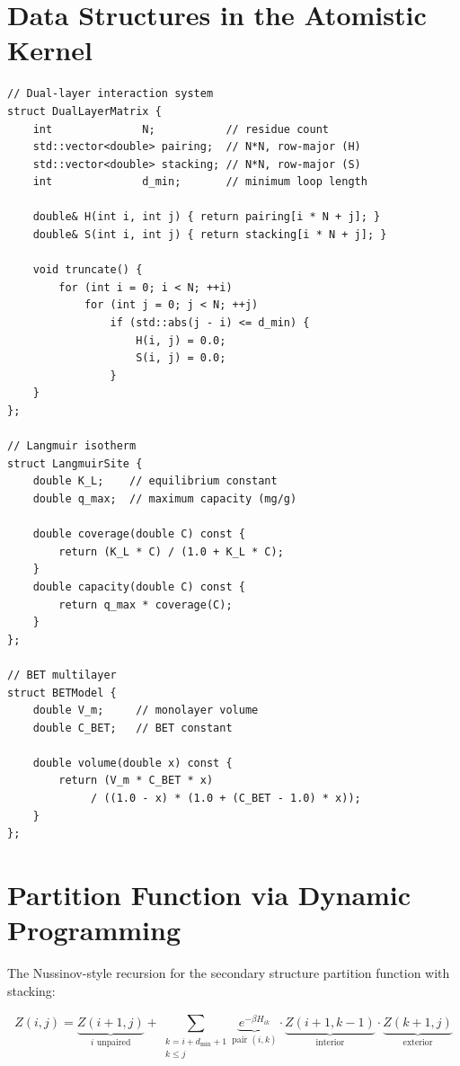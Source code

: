 \documentclass[11pt]{article}
\begin{document}
\section{Data Structures in the Atomistic Kernel}

\begin{lstlisting}
// Dual-layer interaction system
struct DualLayerMatrix {
    int              N;           // residue count
    std::vector<double> pairing;  // N*N, row-major (H)
    std::vector<double> stacking; // N*N, row-major (S)
    int              d_min;       // minimum loop length

    double& H(int i, int j) { return pairing[i * N + j]; }
    double& S(int i, int j) { return stacking[i * N + j]; }

    void truncate() {
        for (int i = 0; i < N; ++i)
            for (int j = 0; j < N; ++j)
                if (std::abs(j - i) <= d_min) {
                    H(i, j) = 0.0;
                    S(i, j) = 0.0;
                }
    }
};

// Langmuir isotherm
struct LangmuirSite {
    double K_L;    // equilibrium constant
    double q_max;  // maximum capacity (mg/g)

    double coverage(double C) const {
        return (K_L * C) / (1.0 + K_L * C);
    }
    double capacity(double C) const {
        return q_max * coverage(C);
    }
};

// BET multilayer
struct BETModel {
    double V_m;     // monolayer volume
    double C_BET;   // BET constant

    double volume(double x) const {
        return (V_m * C_BET * x)
             / ((1.0 - x) * (1.0 + (C_BET - 1.0) * x));
    }
};
\end{lstlisting}

\section{Partition Function via Dynamic Programming}

The Nussinov-style recursion for the secondary structure partition
function with stacking:

\begin{equation}
  Z(i, j) =
  \underbrace{Z(i+1, j)}_{\text{$i$ unpaired}}
  + \sum_{\substack{k = i + d_{\min} + 1 \\ k \leq j}}^{}
    \underbrace{e^{-\beta H_{ik}}}_{\text{pair $(i,k)$}}
    \cdot
    \underbrace{Z(i+1, k-1)}_{\text{interior}}
    \cdot
    \underbrace{Z(k+1, j)}_{\text{exterior}}
\end{equation}
\end{document}
